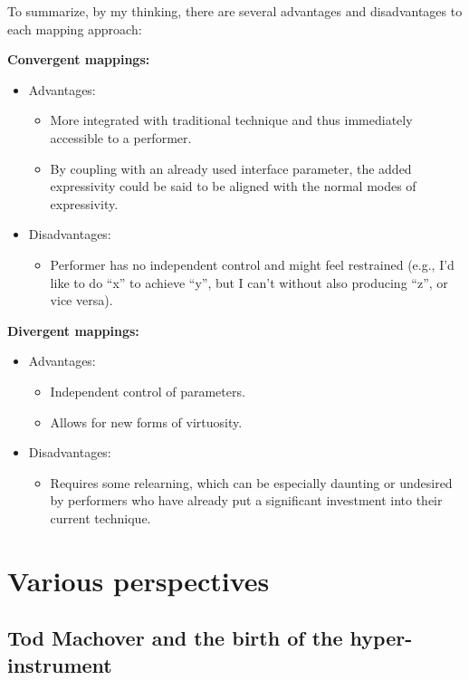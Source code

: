 \documentclass[12pt,twoside,maitrise]{dms_ks}
\theoremstyle{definition}
\begin{document}
{To summarize, by my thinking, there are several advantages and disadvantages to each mapping approach:

\textbf{Convergent mappings:}

\begin{itemize}
  \item Advantages:
  \begin{itemize}
    \item More integrated with traditional technique and thus immediately accessible to a performer.
    \item By coupling with an already used interface parameter, the added expressivity could be said to be aligned with the normal modes of expressivity.
  \end{itemize}
  \item Disadvantages:
  \begin{itemize}
    \item Performer has no independent control and might feel restrained (e.g., I'd like to do “x” to achieve “y”, but I can't without also producing “z”, or vice versa).
  \end{itemize}
\end{itemize}

\textbf{Divergent mappings:}

\begin{itemize}
  \item Advantages:
  \begin{itemize}
    \item Independent control of parameters.
    \item Allows for new forms of virtuosity.
  \end{itemize}
  \item Disadvantages:
  \begin{itemize}
    \item Requires some relearning, which can be especially daunting or undesired by performers who have already put a significant investment into their current technique.
  \end{itemize}
\end{itemize}

\section{Various perspectives}

\subsection{Tod Machover and the birth of the hyper-instrument}

}
\end{document}
